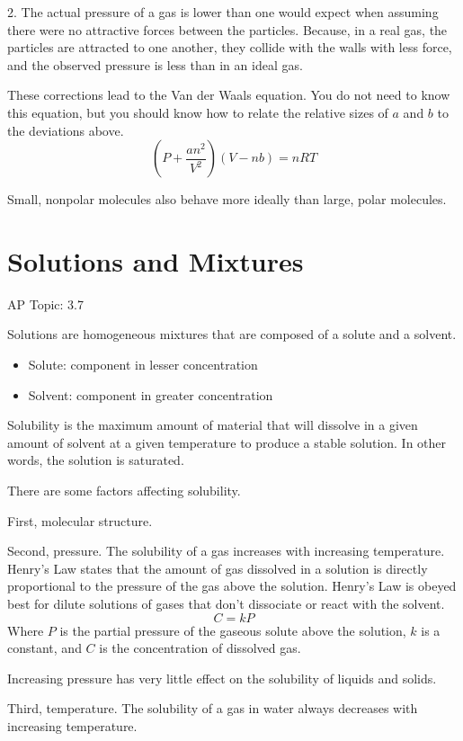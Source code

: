 \documentclass[../chem.tex]{subfiles}
\begin{document}
2. The actual pressure of a gas is lower than one would expect when assuming there were no attractive forces between the particles. Because, in a real gas, the 
particles are attracted to one another, they collide with the walls with less force, and the observed pressure is less than in an ideal gas.

These corrections lead to the Van der Waals equation. You do not need to know this equation, but you should know how to relate the relative sizes of $a$ and $b$ to the deviations above.
\[\left(P+\frac{an^2}{V^2}\right)(V-nb)=nRT \] 

Small, nonpolar molecules also behave more ideally than large, polar molecules.
\section{Solutions and Mixtures}
AP Topic: 3.7

Solutions are homogeneous mixtures that are composed of a solute and a solvent.
\begin{itemize}
    \item Solute: component in lesser concentration 
    \item Solvent: component in greater concentration 
\end{itemize}

Solubility is the maximum amount of material that will dissolve in a given amount of solvent at a given temperature to produce a stable solution. In other words, the solution is saturated.

There are some factors affecting solubility. 

First, molecular structure.

Second, pressure. The solubility of a gas increases with increasing temperature. Henry's Law states that the amount of gas dissolved in a solution 
is directly proportional to the pressure of the gas above the solution. Henry's Law is obeyed best for dilute solutions of gases that don't dissociate 
or react with the solvent.
\[C=kP\]
Where $P$ is the partial pressure of the gaseous solute above the solution, $k$ is a constant, and $C$ is the concentration of dissolved gas.

Increasing pressure has very little effect on the solubility of liquids and solids.

Third, temperature. The solubility of a gas in water always decreases with increasing temperature. 
\end{document}
